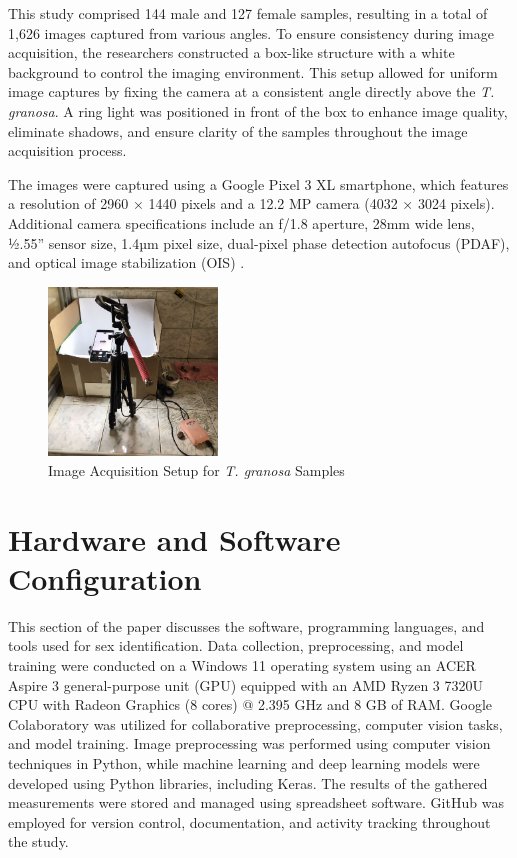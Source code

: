 This study comprised 144 male and 127 female \Tgranosa samples, resulting in a total of 1,626 images captured from various angles. To ensure consistency during image acquisition, the researchers constructed a box-like structure with a white background to control the imaging environment. This setup allowed for uniform image captures by fixing the camera at a consistent angle directly above the \textit{T. granosa}. A ring light was positioned in front of the box to enhance image quality, eliminate shadows, and ensure clarity of the samples throughout the image acquisition process.

The images were captured using a Google Pixel 3 XL smartphone, which features a resolution of 2960 × 1440 pixels and a 12.2 MP camera (4032 × 3024 pixels). Additional camera specifications include an f/1.8 aperture, 28mm wide lens, ½.55” sensor size, 1.4µm pixel size, dual-pixel phase detection autofocus (PDAF), and optical image stabilization (OIS) \cite{concepcion2023}.

\begin{figure}[!htbp]
	\centering
	\includegraphics[width=0.4\textwidth]{figures/setup.jpg}
	\caption{Image Acquisition Setup for \textit{T. granosa} Samples}
	\label{fig: setup}
\end{figure}

\newpage
\section{Hardware and Software Configuration}

This section of the paper discusses the software, programming languages, and tools used for sex identification. Data collection, preprocessing, and model training were conducted on a Windows 11 operating system using an ACER Aspire 3 general-purpose unit (GPU) equipped with an AMD Ryzen 3 7320U CPU with Radeon Graphics (8 cores) @ 2.395 GHz and 8 GB of RAM. Google Colaboratory was utilized for collaborative preprocessing, computer vision tasks, and model training. Image preprocessing was performed using computer vision techniques in Python, while machine learning and deep learning models were developed using Python libraries, including Keras. The results of the gathered measurements were stored and managed using spreadsheet software. GitHub was employed for version control, documentation, and activity tracking throughout the study.

